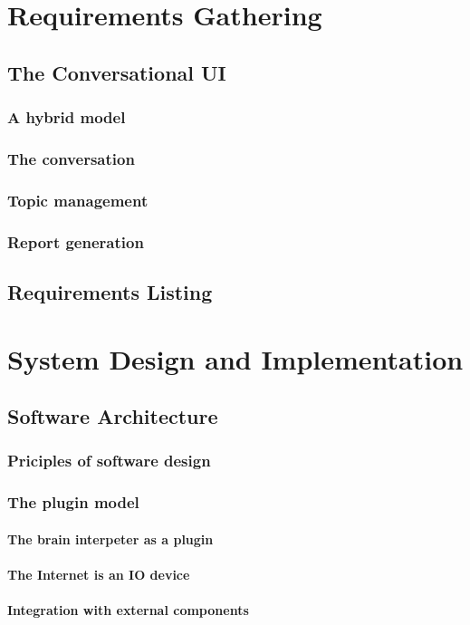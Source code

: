 \documentclass[12pt, twoside, a4paper, draft]{report}
\begin{document}
\chapter{Requirements Gathering}
\section{The Conversational UI}
\subsection{A hybrid model}
\subsection{The conversation}
\subsection{Topic management}
\subsection{Report generation}
\section{Requirements Listing}

\chapter{System Design and Implementation}
\section{Software Architecture}
\subsection{Priciples of software design}
\subsection{The plugin model}
\subsubsection{The brain interpeter as a plugin}
\subsubsection{The Internet is an IO device}
\subsubsection{Integration with external components}
\end{document}
